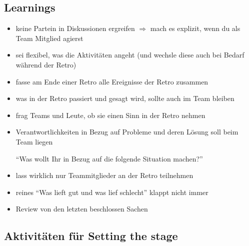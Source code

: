 \subsection{Learnings}
\begin{itemize}
  \item keine Partein in Diskussionen ergreifen $\Rightarrow$  mach es explizit, wenn du als
    Team Mitglied agierst
  \item sei flexibel, was die Aktivitäten angeht (und wechsle diese auch bei Bedarf während der
    Retro)
  \item fasse am Ende einer Retro alle Ereignisse der Retro zusammen
  \item was in der Retro passiert und gesagt wird, sollte auch im Team bleiben
  \item frag Teams und Leute, ob sie einen Sinn in der Retro nehmen
  \item Verantwortlichkeiten in Bezug auf Probleme und deren Lösung soll beim Team liegen

    \enquote{Was wollt Ihr in Bezug auf die folgende Situation machen?}
  \item lass wirklich nur Teammitglieder an der Retro teilnehmen
  \item reines \enquote{Was lieft gut und was lief schlecht} klappt nicht immer
  \item Review von den letzten beschlossen Sachen
\end{itemize}


\subsection{Aktivitäten für Setting the stage}
